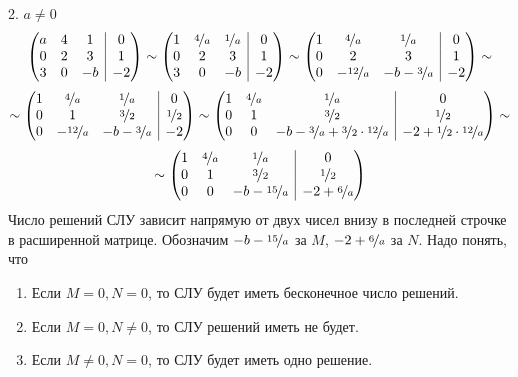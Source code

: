 \documentclass[10pt, a4paper]{extarticle}
\makeatletter
\theoremstyle{definition}
\newenvironment{amatrix}[2]{%
    \left(\begin{array}{@{}*{#1}{c}|*{#2}{c}@{}}
}{%
    \end{array}\right)
}
\makeatother
\begin{document}
2. $a \neq 0$
\[
\begin{amatrix}{3}{1}
a & 4 & 1 & 0\\
0 & 2 & 3 & 1 \\
3 & 0 & -b & -2 
\end{amatrix} \sim
\begin{amatrix}{3}{1}
1 & \nicefrac{4}{a} & \nicefrac{1}{a} & 0\\
0 & 2 & 3 & 1 \\
3 & 0 & -b & -2 
\end{amatrix} \sim
\begin{amatrix}{3}{1}
1 & \nicefrac{4}{a} & \nicefrac{1}{a} & 0\\
0 & 2 & 3 & 1 \\
0 & -\nicefrac{12}{a} & -b - \nicefrac{3}{a} & -2 
\end{amatrix} \sim
\]
\[
\sim
\begin{amatrix}{3}{1}
1 & \nicefrac{4}{a} & \nicefrac{1}{a} & 0\\
0 & 1 & \nicefrac{3}{2} & \nicefrac{1}{2} \\
0 & -\nicefrac{12}{a} & -b - \nicefrac{3}{a} & -2 
\end{amatrix} \sim
\begin{amatrix}{3}{1}
1 & \nicefrac{4}{a} & \nicefrac{1}{a} & 0\\
0 & 1 & \nicefrac{3}{2} & \nicefrac{1}{2} \\
0 & 0 & -b - \nicefrac{3}{a} + \nicefrac{3}{2}\cdot \nicefrac{12}{a}& -2 + \nicefrac{1}{2}\cdot \nicefrac{12}{a} 
\end{amatrix} \sim
\]
\[
\sim \begin{amatrix}{3}{1}
1 & \nicefrac{4}{a} & \nicefrac{1}{a} & 0\\
0 & 1 & \nicefrac{3}{2} & \nicefrac{1}{2} \\
0 & 0 & -b - \nicefrac{15}{a} & -2 + \nicefrac{6}{a} 
\end{amatrix} 
\]
Число решений СЛУ зависит напрямую от двух чисел внизу в последней строчке в расширенной матрице.
Обозначим $-b - \nicefrac{15}{a}$ за $M$, $-2 + \nicefrac{6}{a} $ за $N$. Надо понять, что
\begin{enumerate}
    \item Если $M=0, N=0$, то СЛУ будет иметь бесконечное число решений.
    \item Если $M=0, N \neq 0$, то СЛУ решений иметь не будет.
    \item Если $M \neq 0, N = 0$, то СЛУ будет иметь одно решение.
\end{enumerate}
\end{document}
